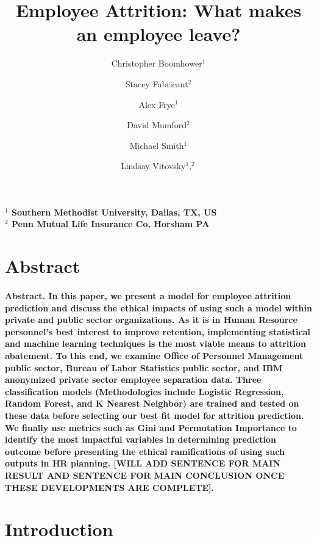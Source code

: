\documentclass{article}
\begin{document}
\title{Employee Attrition: What makes an employee leave?}
\author{
	Christopher Boomhower$^1$
	\and
	Stacey Fabricant$^2$
	\and
	Alex Frye$^1$
	\and
	David Mumford$^2$
	\and
	Michael Smith$^1$
	\and
	Lindsay Vitovsky$^1,^2$
}
\date{}
\maketitle{}

\paragraph{$^1$ Southern Methodist University, Dallas, TX, US\\$^2$ Penn Mutual Life Insurance Co, Horsham PA}

\section{Abstract}

\paragraph{Abstract.  In this paper, we present a model for employee attrition prediction and discuss the ethical impacts of using such a model within private and public sector organizations. As it is in Human Resource personnel’s best interest to improve retention, implementing statistical and machine learning techniques is the most viable means to attrition abatement. To this end, we examine Office of Personnel Management public sector, Bureau of Labor Statistics public sector, and IBM anonymized private sector employee separation data. Three classification models (Methodologies include Logistic Regression, Random Forest, and K Nearest Neighbor) are trained and tested on these data before selecting our best fit model for attrition prediction. We finally use metrics such as Gini and Permutation Importance to identify the most impactful variables in determining prediction outcome before presenting the ethical ramifications of using such outputs in HR planning. [WILL ADD SENTENCE FOR MAIN RESULT AND SENTENCE FOR MAIN CONCLUSION ONCE THESE DEVELOPMENTS ARE COMPLETE].}

\newpage{}
 
\section{Introduction}
\end{document}
